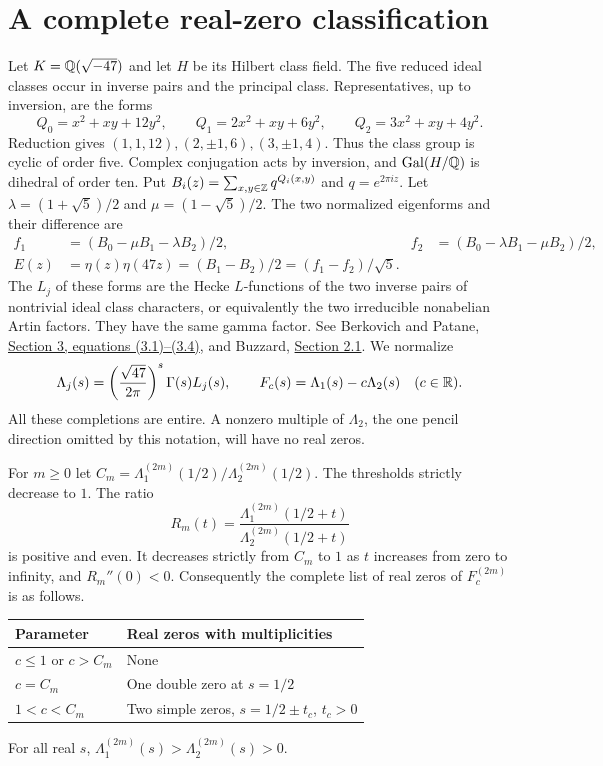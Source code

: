 \section{A complete real-zero classification}
Let $K=\mathbb Q(\sqrt{-47})$ and let $H$ be its Hilbert class field. The five reduced ideal classes occur in inverse pairs and the principal class. Representatives, up to inversion, are the forms
\[
 Q_0=x^2+xy+12y^2,\qquad Q_1=2x^2+xy+6y^2,\qquad
 Q_2=3x^2+xy+4y^2 .
\]
Reduction gives $(1,1,12),(2,\pm1,6),(3,\pm1,4)$. Thus the class group is cyclic of order five. Complex conjugation acts by inversion, and $\operatorname{Gal}(H/\mathbb Q)$ is dihedral of order ten. Put $B_i(z)=\sum_{x,y\in\mathbb Z} q^{Q_i(x,y)}$ and $q=e^{2\pi iz}$. Let $\lambda=(1+\sqrt5)/2$ and $\mu=(1-\sqrt5)/2$. The two normalized eigenforms and their difference are
\begin{align}
 f_1&=(B_0-\mu B_1-\lambda B_2)/2, &
 f_2&=(B_0-\lambda B_1-\mu B_2)/2,\nonumber\\
 E(z)&=\eta(z)\eta(47z)=(B_1-B_2)/2=(f_1-f_2)/\sqrt5. \label{eq:eta}
\end{align}
The $L_j$ of these forms are the Hecke $L$-functions of the two inverse pairs of nontrivial ideal class characters, or equivalently the two irreducible nonabelian Artin factors. They have the same gamma factor. See Berkovich and Patane, \href{https://arxiv.org/pdf/1302.2359}{Section 3, equations (3.1)--(3.4)}, and Buzzard, \href{https://www.ma.imperial.ac.uk/~buzzard/maths/research/papers/wt1.pdf}{Section 2.1}. We normalize
\[
 \Lambda_j(s)=\left(\frac{\sqrt{47}}{2\pi}\right)^s\Gamma(s)L_j(s),
 \qquad F_{c}(s)=\Lambda_1(s)-c\Lambda_2(s) \quad(c\in\mathbb R).
\]
All these completions are entire. A nonzero multiple of $\Lambda_2$, the one pencil direction omitted by this notation, will have no real zeros.

\begin{theorem}\label{th:real}
For $m\ge0$ let $C_m=\Lambda_1^{(2m)}(1/2)/\Lambda_2^{(2m)}(1/2)$. The thresholds strictly decrease to $1$. The ratio
\[
 R_m(t)=\frac{\Lambda_1^{(2m)}(1/2+t)}
                  {\Lambda_2^{(2m)}(1/2+t)}
\]
is positive and even. It decreases strictly from $C_m$ to $1$ as $t$ increases from zero to infinity, and $R_m''(0)<0$. Consequently the complete list of real zeros of $F_c^{(2m)}$ is as follows.
\begin{center}\begin{tabular}{ll}\toprule
Parameter & Real zeros with multiplicities \\\midrule
$c\le1$ or $c>C_m$ & None\\
$c=C_m$ & One double zero at $s=1/2$\\
$1<c<C_m$ & Two simple zeros, $s=1/2\pm t_c$, $t_c>0$\\\bottomrule
\end{tabular}\end{center}
For all real $s$, $\Lambda_1^{(2m)}(s)>\Lambda_2^{(2m)}(s)>0$.
\end{theorem}


